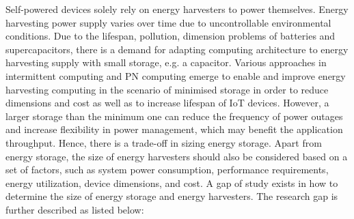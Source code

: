 Self-powered devices solely rely on energy harvesters to power themselves. Energy harvesting power supply varies over time due to uncontrollable environmental conditions. Due to the lifespan, pollution, dimension problems of batteries and supercapacitors, there is a demand for adapting computing architecture to energy harvesting supply with small storage, e.g. a capacitor. Various approaches in intermittent computing and PN computing emerge to enable and improve energy harvesting computing in the scenario of minimised storage in order to reduce dimensions and cost as well as to increase lifespan of IoT devices. However, a larger storage than the minimum one can reduce the frequency of power outages and increase flexibility in power management, which may benefit the application throughput. Hence, there is a trade-off in sizing energy storage. Apart from energy storage, the size of energy harvesters should also be considered based on a set of factors, such as system power consumption, performance requirements, energy utilization, device dimensions, and cost. A gap of study exists in how to determine the size of energy storage and energy harvesters. The research gap is further described as listed below:
